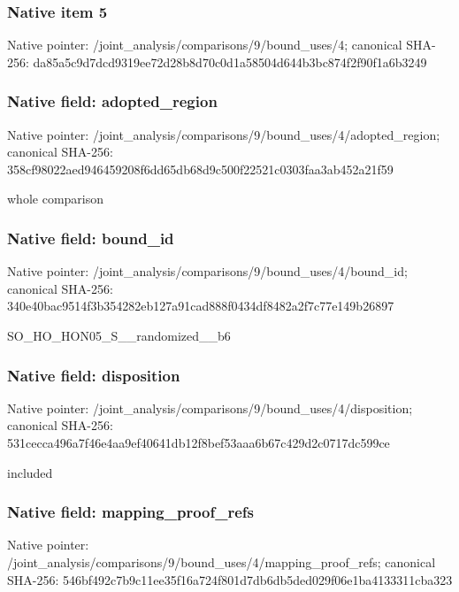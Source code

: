 \documentclass[10pt,a4paper]{article}
\begin{document}
\subsubsection{Native item 5}
Native pointer: /joint\_\allowbreak{}analysis/comparisons/9/bound\_\allowbreak{}uses/4; canonical SHA-256: da85a5c9d7dcd9319ee72d28b8d70c0d1a58504d644b3bc874f2f90f1a6b3249

\subsubsection{Native field: adopted\_\allowbreak{}region}
Native pointer: /joint\_\allowbreak{}analysis/comparisons/9/bound\_\allowbreak{}uses/4/adopted\_\allowbreak{}region; canonical SHA-256: 358cf98022aed946459208f6dd65db68d9c500f22521c0303faa3ab452a21f59

\begingroup\raggedright\sloppy whole comparison\par\endgroup

\subsubsection{Native field: bound\_\allowbreak{}id}
Native pointer: /joint\_\allowbreak{}analysis/comparisons/9/bound\_\allowbreak{}uses/4/bound\_\allowbreak{}id; canonical SHA-256: 340e40bac9514f3b354282eb127a91cad888f0434df8482a2f7c77e149b26897

\begingroup\raggedright\sloppy SO\_\allowbreak{}HO\_\allowbreak{}HON05\_\allowbreak{}S\_\allowbreak{}\_\allowbreak{}randomized\_\allowbreak{}\_\allowbreak{}b6\par\endgroup

\subsubsection{Native field: disposition}
Native pointer: /joint\_\allowbreak{}analysis/comparisons/9/bound\_\allowbreak{}uses/4/disposition; canonical SHA-256: 531cecca496a7f46e4aa9ef40641db12f8bef53aaa6b67c429d2c0717dc599ce

\begingroup\raggedright\sloppy included\par\endgroup

\subsubsection{Native field: mapping\_\allowbreak{}proof\_\allowbreak{}refs}
Native pointer: /joint\_\allowbreak{}analysis/comparisons/9/bound\_\allowbreak{}uses/4/mapping\_\allowbreak{}proof\_\allowbreak{}refs; canonical SHA-256: 546bf492c7b9c11ee35f16a724f801d7db6db5ded029f06e1ba4133311cba323
\end{document}
